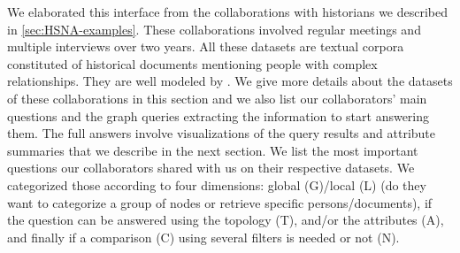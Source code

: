 We elaborated this interface from the collaborations with historians we described in \autoref{sec:HSNA-examples}.
These collaborations involved regular meetings and multiple interviews over two years.
All these datasets are textual corpora constituted of historical documents mentioning people with complex relationships.
They are well modeled by \model.
We give more details about the datasets of these collaborations in this section and we also list our collaborators' main questions and the graph queries extracting the information to start answering them.
The full answers involve visualizations of the query results and attribute summaries that we describe in the next section.
We list the most important questions our collaborators shared with us on their respective datasets.
We categorized those according to four dimensions: global (G)/local (L) (do they want to categorize a group of nodes or retrieve specific persons/documents), if the question can be answered using the topology (T), and/or the attributes (A), and finally if a comparison (C) using several filters is needed or not (N).


